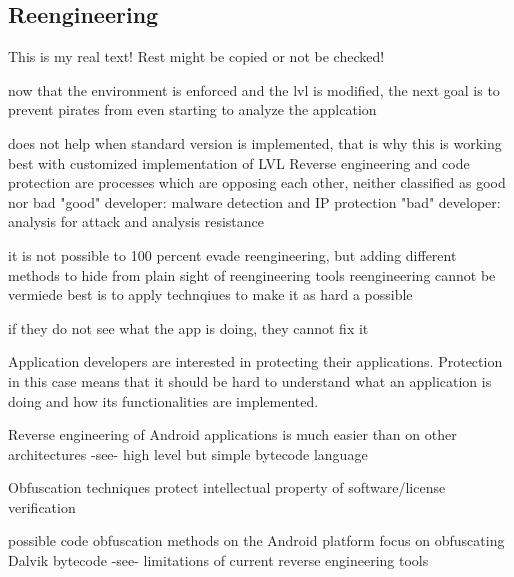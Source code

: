 \subsection{Reengineering} \label{subsection:counter-obfuscation-problem}
This is my real text! Rest might be copied or not be checked!


now that the environment is enforced and the lvl is modified, the next goal is to prevent pirates from even starting to analyze the applcation

does not help when standard version is implemented, that is why this is working best with customized implementation of LVL
%
Reverse engineering and code protection are processes which are opposing each other, neither classified as good nor bad\newline
"good" developer: malware detection and IP protection\newline
"bad" developer: analysis for attack and analysis resistance

\cite{kovachevaMaster}
%
it is not possible to 100 percent evade reengineering, but adding different methods to hide from plain sight of reengineering tools
%
reengineering cannot be vermiede
best is to apply technqiues to make it as hard a possible
\cite{munteanLicense}
%

if they do not see what the app is doing, they cannot fix it

Application developers are interested in protecting their applications. Protection in this case means that it should be hard to understand
what an application is doing and how its functionalities are implemented.\newline


Reverse engineering of Android applications is much easier than on other architectures -see- high level but simple bytecode language\newline

Obfuscation techniques protect intellectual property of software/license verification\newline

possible code obfuscation methods on the Android platform focus on obfuscating Dalvik bytecode -see- limitations of current reverse engineering tools\newline
